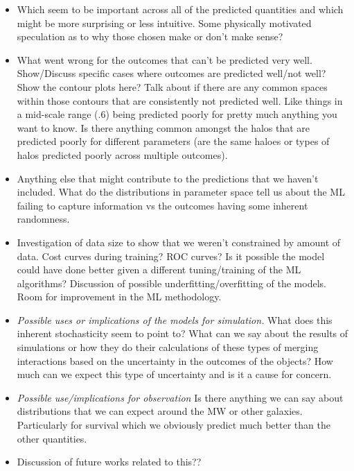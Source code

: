 \documentclass[fleqn,usenatbib]{mnras}
\begin{document}
\begin{itemize}
	\item {} Which seem to be important across all of the predicted quantities and which might be more surprising or less intuitive. Some physically motivated speculation as to why those chosen make or don't make sense?
    \item What went wrong for the outcomes that can't be predicted very well. Show/Discuss specific cases where outcomes are predicted well/not well? Show the contour plots here? Talk about if there are any common spaces within those contours that are consistently not predicted well. Like things in a mid-scale range (.6) being predicted poorly for pretty much anything you want to know. Is there anything common amongst the halos that are predicted poorly for different parameters (are the same haloes or types of halos predicted poorly across multiple outcomes).
    \item {} Anything else that might contribute to the predictions that we haven't included. What do the distributions in parameter space tell us about the ML failing to capture information vs the outcomes having some inherent randomness.
    \item {} Investigation of data size to show that we weren't constrained by amount of data. Cost curves during training? ROC curves? Is it possible the model could have done better given a different tuning/training of the ML algorithms? Discussion of possible underfitting/overfitting of the models. Room for improvement in the ML methodology.
    \item \textit{Possible uses or implications of the models for simulation.} What does this inherent stochasticity seem to point to? What can we say about the results of simulations or how they do their calculations of these types of merging interactions based on the uncertainty in the outcomes of the objects? How much can we expect this type of uncertainty and is it a cause for concern.
    \item \textit{Possible use/implications for observation} Is there anything we can say about distributions that we can expect around the MW or other galaxies. Particularly for survival which we obviously predict much better than the other quantities.
    \item Discussion of future works related to this??

\end{itemize}
\end{document}
